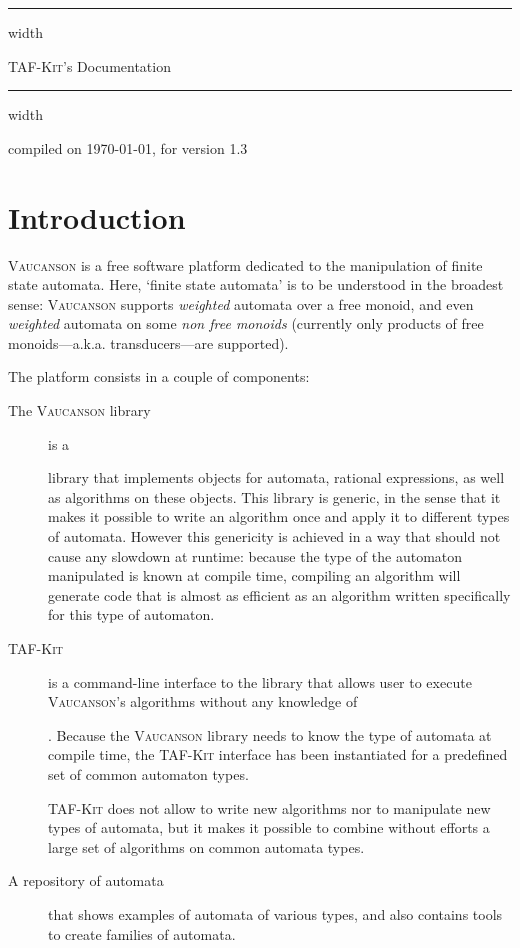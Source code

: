 \documentclass[a4paper]{report}
\makeatletter
\newcommand{\Cxx}{%
  \valign{\vfil\hbox{##}\vfil\cr
    {C\kern-.1em}\cr
    $\hbox{\fontsize\sf@size\z@\textbf{+\kern-0.05em+}}$\cr}%
    \xspace
}
\def\VcsnVersion{1.3}
\newcommand{\tafkit}{\textsc{TAF-Kit}\xspace}
\newcommand{\Vauc}{\textsc{Vaucanson}\xspace}
\def\manualtitle{\tafkit's Documentation}
\makeatother
\begin{document}
\vspace*{50pt}
\vskip4pt \hrule height 4pt width \hsize \vskip4pt
\begin{center}
  \Huge \manualtitle
\end{center}
\vspace*{-1.5ex}
\vskip4pt \hrule height 4pt width \hsize \vskip4pt

\hfill compiled on \today, for version \VcsnVersion

\vfill

\setcounter{tocdepth}{2}
\makeatletter
{}
\makeatother

\vfill

\chapter*{Introduction}
\label{sec:intro}

\Vauc is a free software platform dedicated to the manipulation of
finite state automata.  Here, `finite state automata' is to be
understood in the broadest sense: \Vauc supports \emph{weighted}
automata over a free monoid, and even \emph{weighted} automata on some
\emph{non free monoids} (currently only products of free
monoids---a.k.a. transducers---are supported).

\bigskip

The platform consists in a couple of components:
\begin{description}
\item[The \Vauc library] is a \Cxx library that implements objects for
  automata, rational expressions, as well as algorithms on these
  objects.  This library is generic, in the sense that it makes it
  possible to write an algorithm once and apply it to different types
  of automata.  However this genericity is achieved in a way that
  should not cause any slowdown at runtime: because the type of the
  automaton manipulated is known at compile time, compiling an
  algorithm will generate code that is almost as efficient as an
  algorithm written specifically for this type of automaton.

\item[\tafkit] is a command-line interface to the library that allows
  user to execute \Vauc's algorithms without any knowledge of \Cxx.
  Because the \Vauc library needs to know the type of automata at
  compile time, the \tafkit interface has been instantiated for a
  predefined set of common automaton types.

  \tafkit does not allow to write new algorithms nor to manipulate new
  types of automata, but it makes it possible to combine without
  efforts a large set of algorithms on common automata types.

\item[A repository of automata] that shows examples of automata of
  various types, and also contains tools to create families of
  automata.
\end{description}
\end{document}

